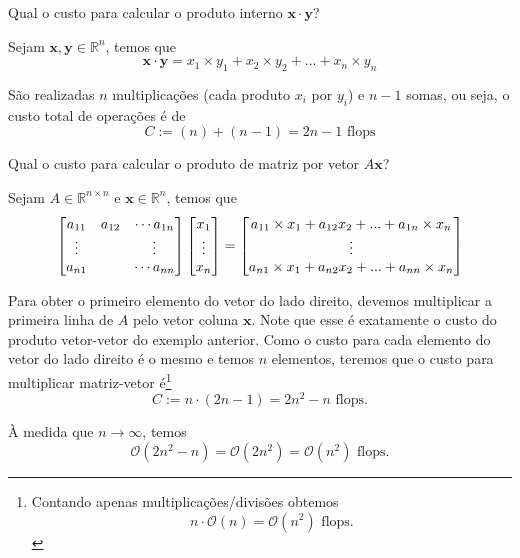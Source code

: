 \begin{ex}
Qual o custo para calcular o produto interno $\pmb{x}\cdot\pmb{y}$?
\end{ex}
\begin{sol}
Sejam $\pmb{x}, \pmb{y} \in \mathbb{R}^n$, temos que
\begin{equation}
  \pmb{x}\cdot\pmb{y} = x_1 \times y_1 + x_2\times y_2 + ... +x_n\times y_n
\end{equation}

São realizadas $n$ multiplicações (cada produto $x_i$ por $y_i$) e $n-1$ somas, ou seja, o custo total de operações é de
\begin{equation}
  C := (n)+(n-1) = 2n-1 \text{~flops}
\end{equation}
\end{sol}


\begin{ex}
Qual o custo para calcular o produto de matriz por vetor $A \pmb{x}$?
\end{ex}
\begin{sol}
 Sejam $A \in \mathbb{R}^{n\times n}$ e $\pmb{x} \in \mathbb{R}^n$, temos que
\begin{equation}
  \begin{bmatrix} a_{11}&a_{12}&\cdots a_{1n} \\ \vdots&&\vdots \\ a_{n1}&&\cdots a_{nn} \end{bmatrix} \begin{bmatrix} x_1 \\ \vdots \\ x_n \end{bmatrix}
  =\begin{bmatrix}  a_{11}\times x_1 + a_{12}x_2 +...+a_{1n}\times x_n  \\ \vdots \\ a_{n1}\times x_1 + a_{n2}x_2 +...+a_{nn}\times x_n \end{bmatrix}
\end{equation}

Para obter o primeiro elemento do vetor do lado direito, devemos multiplicar a  primeira linha de $A$ pelo vetor coluna $\pmb{x}$. Note que esse é exatamente o custo do produto vetor-vetor do exemplo anterior. Como o custo para cada elemento do vetor do lado direito é o mesmo e temos $n$ elementos, teremos que o custo para multiplicar matriz-vetor é\footnote{Contando apenas multiplicações/divisões obtemos
\begin{equation}
  n\cdot \mathcal{O}(n) = \mathcal{O}(n^2) \text{~flops.}
\end{equation}
}
\begin{equation}
  C:=n \cdot ( 2n-1) = 2n^2-n \text{~flops}.
\end{equation}

À medida que $n \rightarrow \infty$, temos
\begin{equation}
  \mathcal{O}(2n^2-n) =\mathcal{O}(2n^2)=\mathcal{O}(n^2) \text{~flops.}
\end{equation}

\end{sol}

